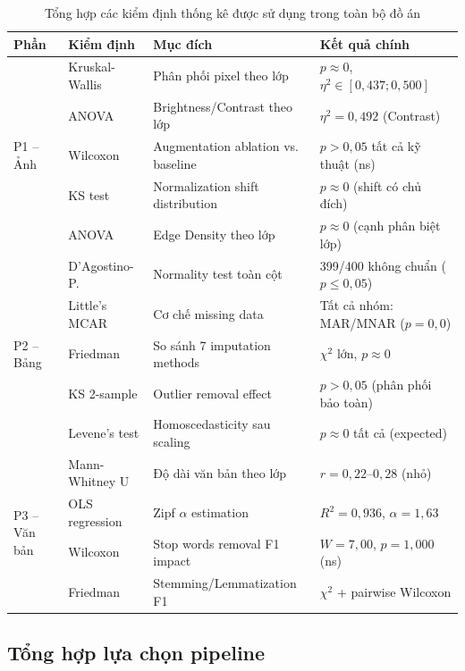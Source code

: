 \documentclass[12pt,a4paper]{article}
\let\oldtextbf\textbf
\renewcommand{\textbf}[1]{\oldtextbf{\textcolor{hcmublue}{#1}}}
\begin{document}
\begin{table}[H]
\centering
\small
\begin{tabular}{|l|l|l|l|}
\hline
\textbf{Phần} & \textbf{Kiểm định} & \textbf{Mục đích} & \textbf{Kết quả chính} \\ \hline
\multirow{5}{*}{P1 -- Ảnh}
  & Kruskal-Wallis & Phân phối pixel theo lớp & $p \approx 0$, $\eta^2 \in [0{,}437; 0{,}500]$ \\ \cline{2-4}
  & ANOVA          & Brightness/Contrast theo lớp & $\eta^2 = 0{,}492$ (Contrast) \\ \cline{2-4}
  & Wilcoxon       & Augmentation ablation vs. baseline & $p > 0{,}05$ tất cả kỹ thuật (ns) \\ \cline{2-4}
  & KS test        & Normalization shift distribution & $p \approx 0$ (shift có chủ đích) \\ \cline{2-4}
  & ANOVA          & Edge Density theo lớp & $p \approx 0$ (cạnh phân biệt lớp) \\ \hline
\multirow{5}{*}{P2 -- Bảng}
  & D'Agostino-P.  & Normality test toàn cột & 399/400 không chuẩn ($p \leq 0{,}05$) \\ \cline{2-4}
  & Little's MCAR  & Cơ chế missing data & Tất cả nhóm: MAR/MNAR ($p = 0{,}0$) \\ \cline{2-4}
  & Friedman       & So sánh 7 imputation methods & $\chi^2$ lớn, $p \approx 0$ \\ \cline{2-4}
  & KS 2-sample    & Outlier removal effect & $p > 0{,}05$ (phân phối bảo toàn) \\ \cline{2-4}
  & Levene's test  & Homoscedasticity sau scaling & $p \approx 0$ tất cả (expected) \\ \hline
\multirow{4}{*}{P3 -- Văn bản}
  & Mann-Whitney U & Độ dài văn bản theo lớp & $r = 0{,}22$--$0{,}28$ (nhỏ) \\ \cline{2-4}
  & OLS regression & Zipf $\alpha$ estimation & $R^2 = 0{,}936$, $\alpha = 1{,}63$ \\ \cline{2-4}
  & Wilcoxon       & Stop words removal F1 impact & $W = 7{,}00$, $p = 1{,}000$ (ns) \\ \cline{2-4}
  & Friedman       & Stemming/Lemmatization F1 & $\chi^2$ + pairwise Wilcoxon \\ \hline
\end{tabular}
\caption{Tổng hợp các kiểm định thống kê được sử dụng trong toàn bộ đồ án}
\label{tab:stats_summary}
\end{table}

\subsection{Tổng hợp lựa chọn pipeline}
\end{document}
